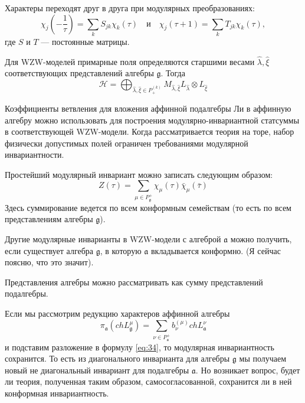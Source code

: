 \documentclass[a4paper,12pt]{article}
\theoremstyle{definition} \newtheorem{Def}{Definition}
\begin{document}
Характеры переходят друг в друга при модулярных преобразованиях:
\begin{equation}
  \label{eq:107} \chi_j\left(-\frac{1}{\tau}\right)=\sum_k S_{jk}\chi_k(\tau)\quad \mbox{и}\quad
\chi_j(\tau+1)=\sum_kT_{jk}\chi_k(\tau),
\end{equation}
где $S$ и $T$ --- постоянные матрицы. 

Для WZW-моделей примарные поля определяются старшими весами  $\hat \lambda, \hat \xi$ соответствующих представлений алгебры $\mathfrak{g}$. Тогда
\begin{equation}
  \label{eq:6} \mathcal{H}=\bigoplus_{\hat \lambda,\hat \xi\in P^{(k)}_{+}}M_{\hat \lambda,\hat \xi}
L_{\hat \lambda}\otimes L_{\hat \xi}
\end{equation}

Коэффициенты ветвления для вложения аффинной подалгебры Ли в аффинную алгебру можно использовать для
построения модулярно-инвариантной статсуммы в соответствующей WZW-модели. Когда рассматривается
теория на торе,  набор физически допустимых полей ограничен требованиями модулярной инвариантности.

Простейший модулярный инвариант можно записать следующим образом:
\begin{equation}
  \label{eq:34}
   Z(\tau)=\sum_{ \mu\in P^{+}_{\mathfrak{g}}} \chi_{\mu}(\tau)\bar \chi_{\mu}(\bar \tau)
\end{equation}
Здесь суммирование ведется по всем конформным семействам (то есть по всем представлениям алгебры
$\mathfrak{g}$).

Другие модулярные инварианты в WZW-модели с алгеброй $\mathfrak{a}$ можно получить, если существует алгебра $\mathfrak{g}$, в которую $\mathfrak{a}$ вкладывается конформно. (Я сейчас поясню, что это значит).

Представления алгебры можно рассматривать как сумму представлений подалгебры. 

Если мы рассмотрим редукцию характеров аффинной алгебры
\begin{equation}
  \label{eq:8}
   \pi_{\mathfrak{a}}(ch L^{\mu}_{\mathfrak{g}})=
  \sum_{\nu\in P^{+}_{\mathfrak{a}}}b^{(\mu)}_{\nu} ch L^{\nu}_{\mathfrak{a}}
\end{equation}
и подставим разложение в формулу \eqref{eq:34}, то модулярная инвариантность сохранится. То есть из
диагонального инварианта для алгебры $\mathfrak{g}$ мы получаем новый не диагональный инвариант для
подалгебры $\mathfrak{a}$. Но возникает вопрос, будет ли теория, полученная таким образом, самосогласованной, сохранится ли в
ней конформная инвариантность.
\end{document}
